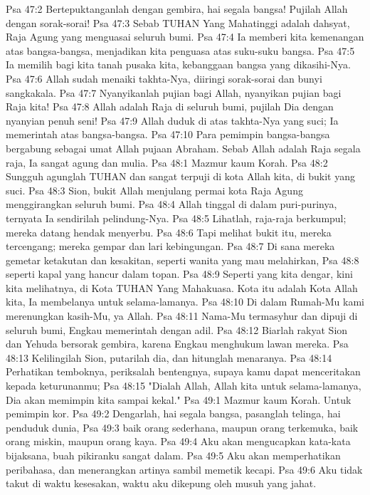 Psa 47:2  Bertepuktanganlah dengan gembira, hai segala bangsa! Pujilah Allah dengan sorak-sorai!
Psa 47:3  Sebab TUHAN Yang Mahatinggi adalah dahsyat, Raja Agung yang menguasai seluruh bumi.
Psa 47:4  Ia memberi kita kemenangan atas bangsa-bangsa, menjadikan kita penguasa atas suku-suku bangsa.
Psa 47:5  Ia memilih bagi kita tanah pusaka kita, kebanggaan bangsa yang dikasihi-Nya.
Psa 47:6  Allah sudah menaiki takhta-Nya, diiringi sorak-sorai dan bunyi sangkakala.
Psa 47:7  Nyanyikanlah pujian bagi Allah, nyanyikan pujian bagi Raja kita!
Psa 47:8  Allah adalah Raja di seluruh bumi, pujilah Dia dengan nyanyian penuh seni!
Psa 47:9  Allah duduk di atas takhta-Nya yang suci; Ia memerintah atas bangsa-bangsa.
Psa 47:10  Para pemimpin bangsa-bangsa bergabung sebagai umat Allah pujaan Abraham. Sebab Allah adalah Raja segala raja, Ia sangat agung dan mulia.
Psa 48:1  Mazmur kaum Korah.
Psa 48:2  Sungguh agunglah TUHAN dan sangat terpuji di kota Allah kita, di bukit yang suci.
Psa 48:3  Sion, bukit Allah menjulang permai kota Raja Agung menggirangkan seluruh bumi.
Psa 48:4  Allah tinggal di dalam puri-purinya, ternyata Ia sendirilah pelindung-Nya.
Psa 48:5  Lihatlah, raja-raja berkumpul; mereka datang hendak menyerbu.
Psa 48:6  Tapi melihat bukit itu, mereka tercengang; mereka gempar dan lari kebingungan.
Psa 48:7  Di sana mereka gemetar ketakutan dan kesakitan, seperti wanita yang mau melahirkan,
Psa 48:8  seperti kapal yang hancur dalam topan.
Psa 48:9  Seperti yang kita dengar, kini kita melihatnya, di Kota TUHAN Yang Mahakuasa. Kota itu adalah Kota Allah kita, Ia membelanya untuk selama-lamanya.
Psa 48:10  Di dalam Rumah-Mu kami merenungkan kasih-Mu, ya Allah.
Psa 48:11  Nama-Mu termasyhur dan dipuji di seluruh bumi, Engkau memerintah dengan adil.
Psa 48:12  Biarlah rakyat Sion dan Yehuda bersorak gembira, karena Engkau menghukum lawan mereka.
Psa 48:13  Kelilingilah Sion, putarilah dia, dan hitunglah menaranya.
Psa 48:14  Perhatikan temboknya, periksalah bentengnya, supaya kamu dapat menceritakan kepada keturunanmu;
Psa 48:15  "Dialah Allah, Allah kita untuk selama-lamanya, Dia akan memimpin kita sampai kekal."
Psa 49:1  Mazmur kaum Korah. Untuk pemimpin kor.
Psa 49:2  Dengarlah, hai segala bangsa, pasanglah telinga, hai penduduk dunia,
Psa 49:3  baik orang sederhana, maupun orang terkemuka, baik orang miskin, maupun orang kaya.
Psa 49:4  Aku akan mengucapkan kata-kata bijaksana, buah pikiranku sangat dalam.
Psa 49:5  Aku akan memperhatikan peribahasa, dan menerangkan artinya sambil memetik kecapi.
Psa 49:6  Aku tidak takut di waktu kesesakan, waktu aku dikepung oleh musuh yang jahat.

